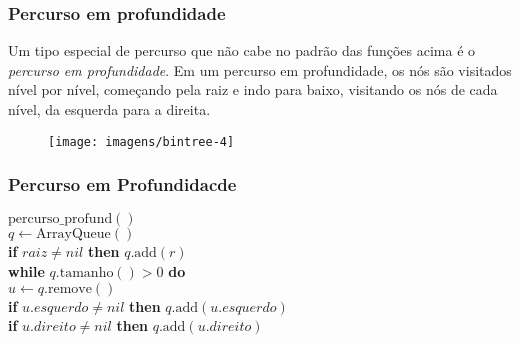 \documentclass{beamer}
\begin{document}
\begin{frame}
\frametitle{Percurso em profundidade}
Um tipo especial de percurso que não cabe no padrão das funções acima é o \emph{percurso em profundidade}.
Em um percurso em profundidade, os nós são visitados nível por nível, começando pela raiz e indo para baixo, visitando os nós de cada nível, da esquerda para a direita.
\begin{figure}
  \begin{center}
    \texttt{[image: imagens/bintree-4]}
  \end{center}
\end{figure}
\end{frame}

\begin{frame}
\frametitle{Percurso em Profundidacde}
\begin{oframed}
\begin{flushleft}
\hspace*{1em} \ensuremath{\mathrm{percurso\_profund}()}\\
\hspace*{1em} \hspace*{1em} \ensuremath{\ensuremath{\mathit{q}} \gets  \ensuremath{\mathrm{\mathrm{ArrayQueue}}()}}\\
\hspace*{1em} \hspace*{1em} {\color{black} \textbf{if}} \ensuremath{\ensuremath{\mathit{raiz}} \ne nil} {\color{black} \textbf{then}}  \ensuremath{\ensuremath{\mathit{q}}.\mathrm{add}(\ensuremath{\mathit{r}})}\\
\hspace*{1em} \hspace*{1em} {\color{black} \textbf{while}} \ensuremath{\ensuremath{\mathit{q}}.\mathrm{tamanho}() > 0} {\color{black} \textbf{do}} \\
\hspace*{1em} \hspace*{1em} \hspace*{1em} \ensuremath{\ensuremath{\mathit{u}} \gets  \ensuremath{\ensuremath{\mathit{q}}.\mathrm{remove}()}}\\
\hspace*{1em} \hspace*{1em} \hspace*{1em} {\color{black} \textbf{if}} \ensuremath{\ensuremath{\mathit{u}}.\ensuremath{\mathit{esquerdo}} \ne nil} {\color{black} \textbf{then}}  \ensuremath{\ensuremath{\mathit{q}}.\mathrm{add}(\ensuremath{\mathit{u}}.\ensuremath{\mathit{esquerdo}})}\\
\hspace*{1em} \hspace*{1em} \hspace*{1em} {\color{black} \textbf{if}} \ensuremath{\ensuremath{\mathit{u}}.\ensuremath{\mathit{direito}} \ne nil} {\color{black} \textbf{then}}  \ensuremath{\ensuremath{\mathit{q}}.\mathrm{add}(\ensuremath{\mathit{u}}.\ensuremath{\mathit{direito}})}\\
\end{flushleft}
\end{oframed}
\end{frame}
\end{document}
